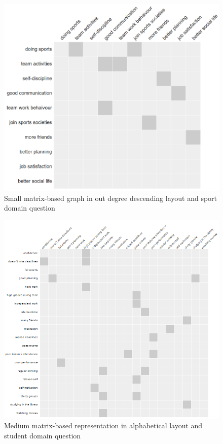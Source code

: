 \documentclass{l4proj}
\begin{document}
\begin{appendices}
\begin{figure}[H]
\centering
\includegraphics[width=16cm]{images/gymSmallOutDD.PNG}
\caption{Small matrix-based graph in out degree descending layout and sport domain question}
\label{gymSmallOutDD}
\end{figure}



\begin{figure}[H]
\centering
\includegraphics[width=15cm]{images/studentMedAlpha.PNG}
\caption{Medium matrix-based representation in alphabetical layout and student domain question}
\label{studentMedAlpha}
\end{figure}



\end{appendices}
\end{document}
